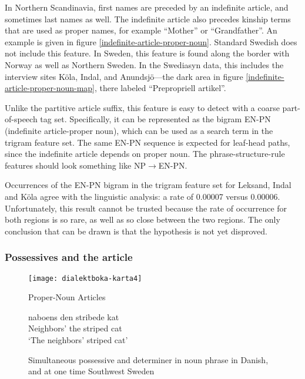 In Northern Scandinavia, first names are preceded by an indefinite
article, and sometimes last names as well. The indefinite article also
precedes kinship terms that are used as proper names, for example
``Mother'' or ``Grandfather''. An example is given in figure
\ref{indefinite-article-proper-noun}. Standard Swedish does not
include this feature. In Sweden, this feature is found along the
border with Norway as well as Northern Sweden. In the Swediasyn data, this
includes the interview sites K\"ola, Indal, and Anundsj\"o---the dark
area in figure \ref{indefinite-article-proper-noun-map}, there labeled
``Prepropriell artikel''.

Unlike the partitive article suffix, this feature is easy to detect
with a coarse part-of-speech tag set. Specifically, it can be represented as the
bigram EN-PN (indefinite article-proper noun), which can be used as a
search term in the trigram feature set. The same EN-PN sequence is
expected for leaf-head paths, since the indefinite article depends on
proper noun. The phrase-structure-rule features should
look something like NP$\to$EN-PN.

Occurrences of the EN-PN bigram in the trigram feature set for
Leksand, Indal and K\"ola agree with the linguistic analysis: a rate
of 0.00007 versus 0.00006. Unfortunately, this result cannot be
trusted because the rate of occurrence for both regions is so rare, as
well as so close between the two regions. The only conclusion that can
be drawn is that the hypothesis is not yet disproved.

\subsubsection{Possessives and the article}

\begin{figure}
  \texttt{[image: dialektboka-karta4]}
  \caption{Proper-Noun Articles}
  \label{possessive-plus-article-map}
\end{figure}

\begin{figure}
 \gll naboens den stribede kat \\
  Neighbors' the striped cat \\
  \trans `The neighbors' striped cat'
  \caption{Simultaneous possessive and determiner in noun phrase in
    Danish, and at one time Southwest Sweden}
  \label{possessive-plus-article-example}
\end{figure}

